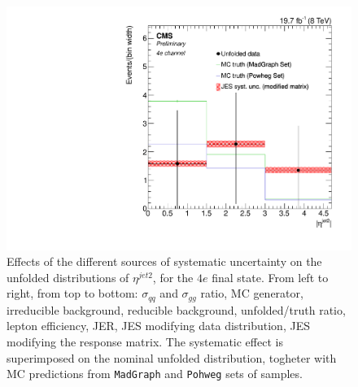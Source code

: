 \begin{figure}[hbtp]
\begin{center}
   \includegraphics[width=0.8\cmsFigWidth]{Figures/Unfolding/Systematics/ZZTo4e_EtaJet2_JES_ModMat_Mad_fr}
   \caption{Effects of the different sources of systematic uncertainty on the unfolded distributions of  $\eta^{jet2}$, for the     
   $4e$ final state. From left to right, from top to bottom: $\sigma_{qq}$ and $\sigma_{gg}$ ratio, MC generator, irreducible background, reducible background, unfolded/truth ratio, lepton efficiency, JER, JES modifying data distribution, JES modifying the response matrix. The systematic effect is superimposed on the nominal unfolded distribution, togheter with MC predictions from \texttt{MadGraph} and \texttt{Pohweg} sets of samples.}
   \label{fig:EtaJet2_syst_4e}
 \end{center}
\end{figure}

